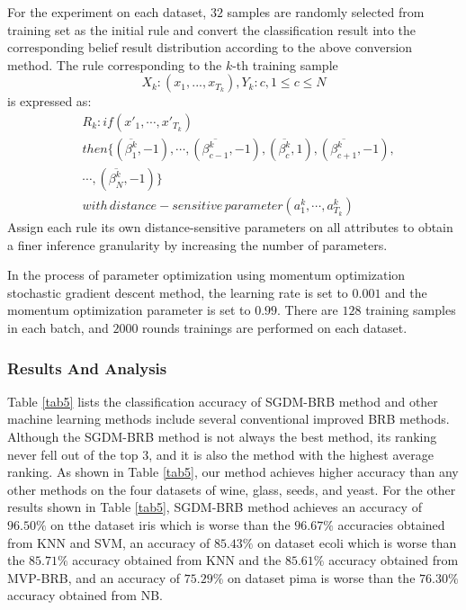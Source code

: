 \documentclass{ieeeaccess}
\begin{document}
For the experiment on each dataset, $32$ samples are randomly selected from training set as the initial rule
and convert the classification result into the corresponding belief result distribution according to the above conversion method.
The rule corresponding to the $k$-th training sample
\begin{equation}
    X_k:(x_1,...,x_{T_k}),Y_k:c,1\leq c\leq N
\end{equation}
is expressed as:
\begin{equation}
    \begin{split}
        &R_k:if(x'_1,\cdots,x'_{T_k})\\
        &then\{(\overline{\beta_1^k},-1),\cdots,(\overline{\beta_{c-1}^k},-1),(\overline{\beta_c^k},1),(\overline{\beta_{c+1}^k},-1),\\
        &\cdots,(\overline{\beta_N^k},-1)\}\\
        &with\, distance-sensitive\, parameter(a^k_1,\cdots,a^k_{T_k})
    \end{split}
\end{equation}
Assign each rule its own distance-sensitive parameters on all attributes to obtain a finer inference granularity by increasing the number of parameters.

In the process of parameter optimization using momentum optimization stochastic gradient descent method,
the learning rate is set to $0.001$ and the momentum optimization parameter is set to $0.99$.
There are $128$ training samples in each batch, and $2000$ rounds trainings are performed on each dataset.

\subsubsection{Results And Analysis}
Table \ref{tab5} lists the classification accuracy of SGDM-BRB method and other machine learning methods include several conventional improved BRB methods.
Although the SGDM-BRB method is not always the best method, its ranking never fell out of the top $3$, and it is also the method with the highest average ranking.
As shown in Table \ref{tab5}, our method achieves higher accuracy than any other methods on the four datasets of
wine, glass, seeds, and yeast.
For the other results shown in Table \ref{tab5},
SGDM-BRB method achieves
an accuracy of $96.50\%$ on tthe dataset iris
which is worse than the $96.67\%$ accuracies obtained from KNN and SVM,
an accuracy of $85.43\%$ on dataset ecoli
which is worse than the $85.71\%$ accuracy obtained from KNN and the $85.61\%$ accuracy obtained from MVP-BRB,
and an accuracy of $75.29\%$ on dataset pima is worse than the $76.30\%$ accuracy obtained from NB.
\end{document}
